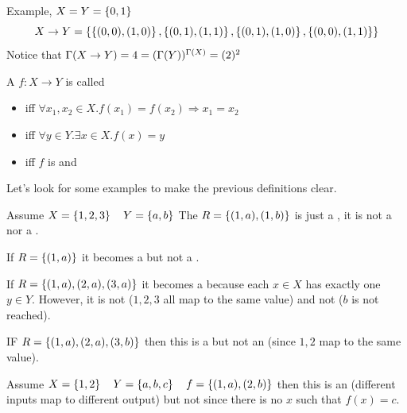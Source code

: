 

Example, $X = Y = \left\{0,1\right\}$
\[
X \to Y = \left\{\left\{(0,0),(1,0)\right\}, \left\{(0,1),(1,1)\right\}, \left\{(0,1), (1,0)\right\}, \left\{(0,0), (1,1)\right\}\right\}
\]
Notice that $\Gamma (X \to Y) = 4 = (\Gamma (Y))^{\Gamma (X)} = (2)^{2}$




A  $f: X \to Y$ is called
\begin{itemize}
\item {} iff $\forall x_1,x_2 \in X.f(x_1) = f(x_2) \Rightarrow x_1 = x_2$
\item {} iff $\forall y \in Y. \exists x \in X.f(x)=y$
\item {} iff $f$ is  and  
\end{itemize}

Let's look for some examples to make the previous definitions clear. 

Assume $X = \left\{1,2,3\right\} \quad Y = \left\{a,b\right\}$ The  $R=\left\{(1,a), (1,b)\right\}$ is just a , it is not a  nor a .

If $R = \left\{(1,a)\right\}$ it becomes a  but not a .

If $R = \left\{(1,a),(2,a),(3,a)\right\}$ it becomes a  because each $x \in X$ has exactly one $y \in Y$. However, it is not  ($1,2,3$ all map to the same value) and not  ($b$ is not reached).

IF $R = \left\{(1,a),(2,a),(3,b)\right\}$ then this is a   but not an  (since $1,2$ map to the same value).

Assume $X = \left\{1,2\right\} \quad Y=\left\{a,b,c\right\} \quad f = \left\{(1,a),(2,b)\right\}$ then this is an   (different inputs map to different output) but not  since there is no $x$ such that  $f(x) = c$.

